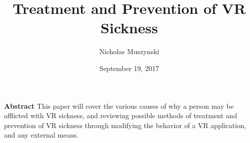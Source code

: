 \documentclass{article}
\begin{document}
\title{Treatment and Prevention of VR Sickness}
\author{Nicholas Muszynski}
\date{September 19, 2017}

\maketitle

\textbf{Abstract}
\newline
This paper will cover the various causes of why a person may be afflicted with VR sickness, and reviewing possible methods of treatment and prevention of VR sickness through modifying the behavior of a VR application, and any external means.
\end{document}
